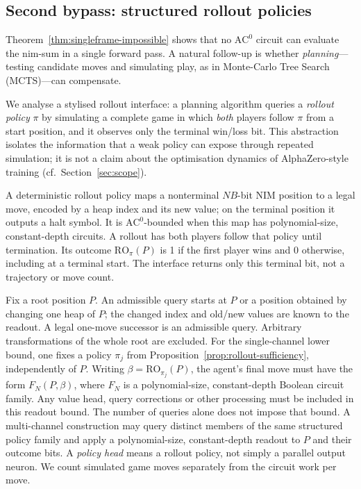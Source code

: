 \documentclass[twoside,11pt]{article}
\newcommand{\AC}{\mathrm{AC}}
\numberwithin{theorem}{section}
\numberwithin{equation}{section}
\begin{document}
\subsection{Second bypass: structured rollout policies}
\label{sec:search-gap}

Theorem~\ref{thm:singleframe-impossible} shows that no $\AC^0$ circuit can evaluate the nim-sum in a single forward pass.
A natural follow-up is whether \emph{planning}---testing candidate moves and simulating play, as in Monte-Carlo Tree Search (MCTS)---can compensate.

We analyse a stylised rollout interface: a planning algorithm queries a \emph{rollout policy} $\pi$ by simulating a complete game in which \emph{both} players follow $\pi$ from a start position, and it observes only the terminal win/loss bit.
This abstraction isolates the information that a weak policy can expose through repeated simulation; it is not a claim about the optimisation dynamics of AlphaZero-style training (cf.\ Section~\ref{sec:scope}).

\begin{definition}
\label{def:rollout-policy}
A deterministic rollout policy maps a nonterminal $NB$-bit NIM position to a legal move, encoded by a heap index and its new value; on the terminal position it outputs a halt symbol. It is $\AC^0$-bounded when this map has polynomial-size, constant-depth circuits.
A rollout has both players follow that policy until termination. Its outcome $\mathrm{RO}_{\pi}(P)$ is 1 if the first player wins and 0 otherwise, including at a terminal start. The interface returns only this terminal bit, not a trajectory or move count.
\end{definition}

\begin{definition}
\label{def:agent-types}
Fix a root position $P$. An admissible query starts at $P$ or a position obtained by changing one heap of $P$; the changed index and old/new values are known to the readout. A legal one-move successor is an admissible query. Arbitrary transformations of the whole root are excluded.
For the single-channel lower bound, one fixes a policy $\pi_j$ from Proposition~\ref{prop:rollout-sufficiency}, independently of $P$. Writing $\beta=\mathrm{RO}_{\pi_j}(P)$, the agent's final move must have the form $F_N(P,\beta)$, where $F_N$ is a polynomial-size, constant-depth Boolean circuit family. Any value head, query corrections or other processing must be included in this readout bound. The number of queries alone does not impose that bound.
A multi-channel construction may query distinct members of the same structured policy family and apply a polynomial-size, constant-depth readout to $P$ and their outcome bits. A \emph{policy head} means a rollout policy, not simply a parallel output neuron. We count simulated game moves separately from the circuit work per move.
\end{definition}
\end{document}
